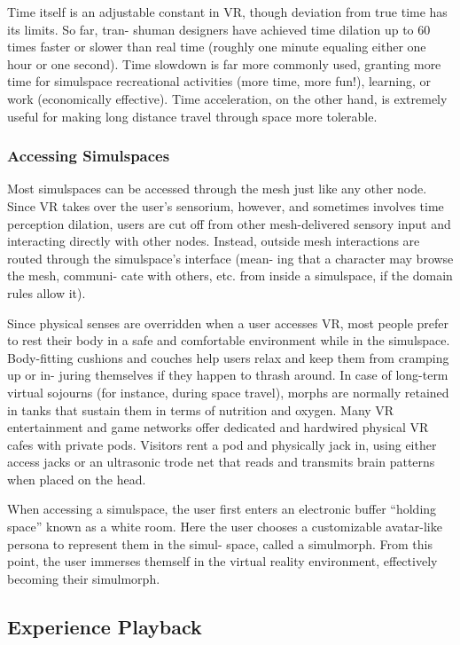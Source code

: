 Time itself is an adjustable constant in VR, though 
deviation from true time has its limits. So far, tran-
shuman designers have achieved time dilation up to 
60 times faster or slower than real time (roughly one 
minute equaling either one hour or one second). Time 
slowdown is far more commonly used, granting more 
time for simulspace recreational activities (more time, 
more fun!), learning, or work (economically effective). 
Time acceleration, on the other hand, is extremely 
useful for making long distance travel through space 
more tolerable.

\subsubsection{Accessing Simulspaces}

Most simulspaces can be accessed through the mesh 
just like any other node. Since VR takes over the 
user's sensorium, however, and sometimes involves 
time perception dilation, users are cut off from other 
mesh-delivered sensory input and interacting directly 
with other nodes. Instead, outside mesh interactions 
are routed through the simulspace's interface (mean-
ing that a character may browse the mesh, communi-
cate with others, etc. from inside a simulspace, if the 
domain rules allow it).

Since physical senses are overridden when a user 
accesses VR, most people prefer to rest their body 
in a safe and comfortable environment while in the 
simulspace. Body-fitting cushions and couches help 
users relax and keep them from cramping up or in-
juring themselves if they happen to thrash around. 
In case of long-term virtual sojourns (for instance, 
during space travel), morphs are normally retained 
in tanks that sustain them in terms of nutrition and 
oxygen. Many VR entertainment and game networks 
offer dedicated and hardwired physical VR cafes 
with private pods. Visitors rent a pod and physically 
jack in, using either access jacks or an ultrasonic 
trode net that reads and transmits brain patterns 
when placed on the head.

When accessing a simulspace, the user first enters 
an electronic buffer ``holding space'' known as a 
white room. Here the user chooses a customizable 
avatar-like persona to represent them in the simul-
space, called a simulmorph. From this point, the user 
immerses themself in the virtual reality environment, 
effectively becoming their simulmorph.

\subsection{Experience Playback}

